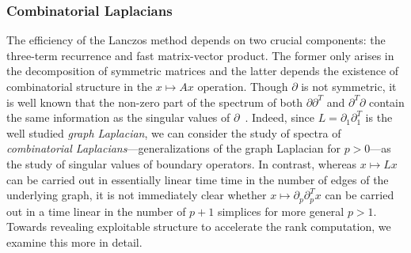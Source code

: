 \documentclass[10pt]{article}
\numberwithin{equation}{section}
\newcommand{\+}{%
	\raisebox{0.18ex}{\scaleobj{0.55}{+}}
}
\theoremstyle{definition}
\begin{document}
\subsubsection{Combinatorial Laplacians}
The efficiency of the Lanczos method depends on two crucial components: the three-term recurrence and fast matrix-vector product. 
The former only arises in the decomposition of symmetric matrices and the latter depends the existence of combinatorial structure in the $x \mapsto A x$ operation. 
Though $\partial$ is not symmetric, it is well known that the non-zero part of the spectrum of both $\partial \partial^T$ and $\partial^T \partial$ contain the same information as the singular values of $\partial$~\cite{}. 
Indeed, since $L = \partial_1 \partial_1^T$ is the well studied \emph{graph Laplacian}, we can consider the study of spectra of \emph{combinatorial Laplacians}---generalizations of the graph Laplacian for $p > 0$---as the study of singular values of boundary operators.
In contrast, whereas $x \mapsto Lx$ can be carried out in essentially linear time time in the number of edges of the underlying graph, it is not immediately clear whether $x \mapsto \partial_p \partial_p^T x$ can be carried out in a time linear in the number of $p+1$ simplices for more general $p > 1$. Towards revealing exploitable structure to accelerate the rank computation, we examine this more in detail.
\end{document}
